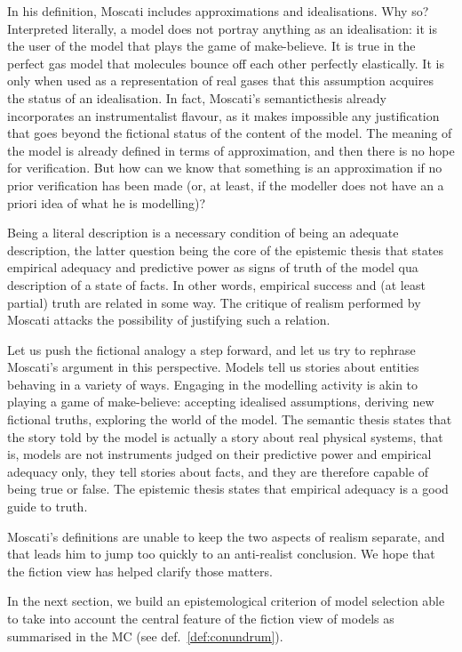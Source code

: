 \documentclass[a4paper,11pt]{article}
\theoremstyle{definition}
\begin{document}
In his definition, Moscati includes approximations and idealisations. Why so? Interpreted literally, a model does not portray anything as an idealisation: it is the user of the model that plays the game of make-believe. It is true in the perfect gas model that molecules bounce off each other perfectly elastically. It is only when used as a representation of real gases that this assumption acquires the status of an idealisation. In fact, Moscati's semanticthesis already incorporates an instrumentalist flavour, as it makes impossible any justification that goes beyond the fictional status of the content of the model. The meaning of the model is already defined in terms of approximation, and then there is no hope for verification. But how can we know that something is an approximation if no prior verification has been made (or, at least, if the modeller does not have an a priori idea of what he is modelling)?  

Being a literal description is a necessary condition of being an adequate description, the latter question being the core of the epistemic thesis that states empirical adequacy and predictive power as signs of truth of the model qua description of a state of facts. In other words, empirical success and (at least partial) truth are related in some way. The critique of realism performed by Moscati attacks the possibility of justifying such a relation.

Let us push the fictional analogy a step forward, and let us try to rephrase Moscati's argument in this perspective. Models tell us stories about entities behaving in a variety of ways. Engaging in the modelling activity is akin to playing a game of make-believe: accepting idealised assumptions, deriving new fictional truths, exploring the world of the model. The semantic thesis states that the story told by the model is actually a story about real physical systems, that is, models are not instruments judged on their predictive power and empirical adequacy only, they tell stories about facts, and they are therefore capable of being true or false. The epistemic thesis states that empirical adequacy is a good guide to truth.

Moscati's definitions are unable to keep the two aspects of realism separate, and that leads him to jump too quickly to an anti-realist conclusion. We hope that the fiction view has helped clarify those matters.

In the next section, we build an epistemological criterion of model selection able to take into account the central feature of the fiction view of models as summarised in the MC (see def.~\ref{def:conundrum}). 
\end{document}
